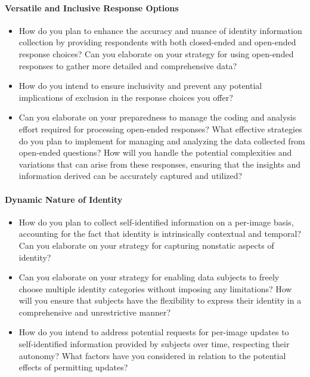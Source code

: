 \paragraph{Versatile and Inclusive Response Options}
\begin{itemize}
    \item How do you plan to enhance the accuracy and nuance of identity information
    collection by providing respondents with both closed-ended and open-ended response
    choices? Can you elaborate on your strategy for using open-ended responses to
    gather more detailed and comprehensive data?
    \item How do you intend to ensure inclusivity and prevent any potential
    implications of exclusion in the response choices you offer?
    \item Can you elaborate on your preparedness to manage the coding and analysis
    effort required for processing open-ended responses? What effective strategies
    do you plan to implement for managing and analyzing the data collected from
    open-ended questions? How will you handle the potential complexities and variations
    that can arise from these responses, ensuring that the insights and information
    derived can be accurately captured and utilized?
\end{itemize}

\paragraph{Dynamic Nature of Identity}
\begin{itemize}
    \item How do you plan to collect self-identified information on a per-image basis,
    accounting for the fact that identity is intrinsically contextual and temporal? Can
    you elaborate on your strategy for capturing nonstatic aspects of identity?
    \item Can you elaborate on your strategy for enabling data subjects to freely
    choose multiple identity categories without imposing any limitations? How will you
    ensure that subjects have the flexibility to express their identity in a
    comprehensive and unrestrictive manner?
    \item How do you intend to address potential requests for per-image updates to
    self-identified information provided by subjects over time, respecting their
    autonomy? What factors have you considered in relation to the potential effects of
    permitting updates?
\end{itemize}

